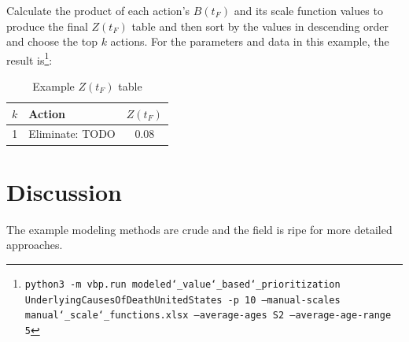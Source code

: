 \documentclass[12pt, a4paper, twocolumn]{article}
\begin{document}
Calculate the product of each action's $B(t_F)$ and its scale function values to produce the final $Z(t_F)$ table and then sort by the values in descending order and choose the top $k$ actions. For the parameters and data in this example, the result is\footnote{\texttt{python3 -m vbp.run modeled\char`_value\char`_based\char`_prioritization UnderlyingCausesOfDeathUnitedStates -p 10 --manual-scales manual\char`_scale\char`_functions.xlsx --average-ages S2 --average-age-range 5}}:

\begin{table}[H]
  \centering
  \begin{tabular}{clc}
    \toprule
      $k$ & Action          & $Z(t_F)$ \\
    \midrule
      1   & Eliminate: TODO & 0.08     \\
    \bottomrule
  \end{tabular}
  \caption{Example $Z(t_F)$ table}
  \label{table:ztable}
\end{table}

\section{Discussion}

The example modeling methods are crude and the field is ripe for more detailed approaches.



\end{document}
